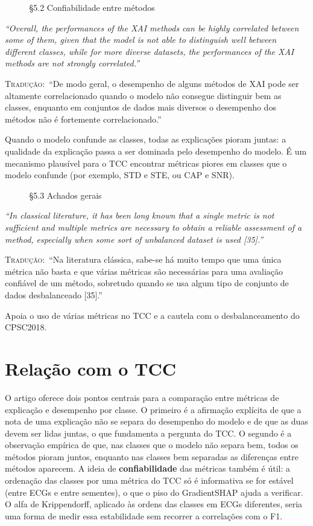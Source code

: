 \documentclass[11pt,a4paper]{article}
\newcommand{\pagechip}[1]{{\setlength{\fboxsep}{1.5pt}\colorbox{cAcc}{\textcolor{white}{\scriptsize\texttt{#1}}}}}
\newenvironment{origquote}{\par\itshape\small}{\par}
\newenvironment{tradquote}{\par\small\textsc{Tradução:}\ }{\par}
\newcommand{\explab}[1]{\par\smallskip{\small\color{cAcc}\textbf{\MakeUppercase{#1}}}\par}
\begin{document}
\begin{citacard}{\pagechip{p. 10} §5.2 Confiabilidade entre métodos}
\begin{origquote}“Overall, the performances of the XAI methods can be highly correlated between some of them, given that the model is not able to distinguish well between different classes, while for more diverse datasets, the performances of the XAI methods are not strongly correlated.”\end{origquote}
\begin{tradquote}“De modo geral, o desempenho de alguns métodos de XAI pode ser altamente correlacionado quando o modelo não consegue distinguir bem as classes, enquanto em conjuntos de dados mais diversos o desempenho dos métodos não é fortemente correlacionado.”\end{tradquote}
\explab{Explicação}
Quando o modelo confunde as classes, todas as explicações pioram juntas: a qualidade da explicação passa a ser dominada pelo desempenho do modelo. É um mecanismo plausível para o TCC encontrar métricas piores em classes que o modelo confunde (por exemplo, STD e STE, ou CAP e SNR).
\end{citacard}

\begin{citacard}{\pagechip{p. 12} §5.3 Achados gerais}
\begin{origquote}“In classical literature, it has been long known that a single metric is not sufficient and multiple metrics are necessary to obtain a reliable assessment of a method, especially when some sort of unbalanced dataset is used [35].”\end{origquote}
\begin{tradquote}“Na literatura clássica, sabe-se há muito tempo que uma única métrica não basta e que várias métricas são necessárias para uma avaliação confiável de um método, sobretudo quando se usa algum tipo de conjunto de dados desbalanceado [35].”\end{tradquote}
\explab{Explicação}
Apoia o uso de várias métricas no TCC e a cautela com o desbalanceamento do CPSC2018.
\end{citacard}

\section{Relação com o TCC}
O artigo oferece dois pontos centrais para a comparação entre métricas de explicação e desempenho por classe. O primeiro é a afirmação explícita de que a nota de uma explicação não se separa do desempenho do modelo e de que as duas devem ser lidas juntas, o que fundamenta a pergunta do TCC. O segundo é a observação empírica de que, nas classes que o modelo não separa bem, todos os métodos pioram juntos, enquanto nas classes bem separadas as diferenças entre métodos aparecem. A ideia de \textbf{confiabilidade} das métricas também é útil: a ordenação das classes por uma métrica do TCC só é informativa se for estável (entre ECGs e entre sementes), o que o piso do GradientSHAP ajuda a verificar. O alfa de Krippendorff, aplicado às ordens das classes em ECGs diferentes, seria uma forma de medir essa estabilidade sem recorrer a correlações com o F1.
\end{document}
